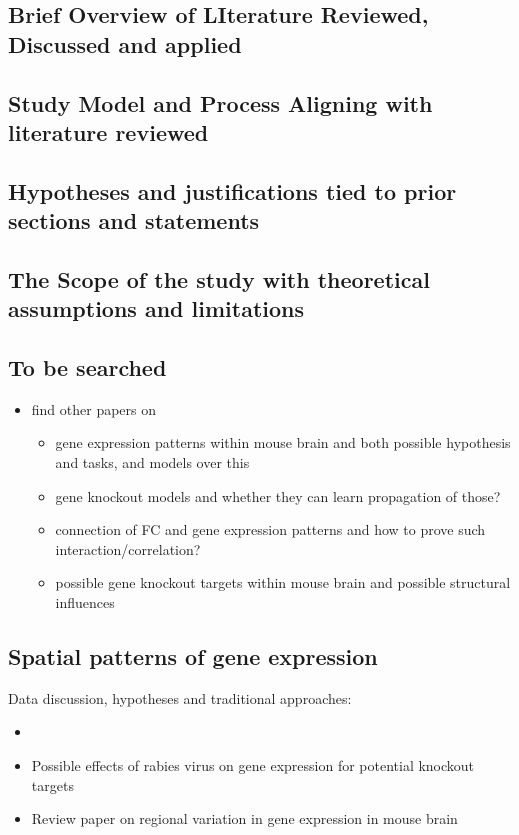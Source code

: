 \documentclass[]{article}
\renewcommand{\cite}{\citep}
\begin{document}
\subsection*{Brief Overview of LIterature Reviewed, Discussed and applied}

\subsection*{Study Model and Process Aligning with literature reviewed}

\subsection*{Hypotheses and justifications tied to prior sections and statements}

\subsection*{The Scope of the study with theoretical assumptions and limitations}

\subsection*{To be searched}
\begin{itemize}

	\item find other papers on
	\begin{itemize}
		\item gene expression patterns within mouse brain and both possible hypothesis and tasks, and models over this
		\item gene knockout models and whether they can learn propagation of those?
		\item connection of FC and gene expression patterns and how to prove such interaction/correlation?
		\item possible gene knockout targets within mouse brain and possible structural influences
	\end{itemize}
\end{itemize}



\subsection*{Spatial patterns of gene expression}

Data discussion, hypotheses and traditional approaches:
\begin{itemize}
	\item \cite{noauthor_clustering_nodate}
	\item Possible effects of rabies virus on gene expression\cite{prosniak_effect_2001} for potential knockout targets
	
	\item Review paper on regional variation in gene expression in mouse brain \cite{pavlidis_analysis_2001}
\end{itemize}
\end{document}

